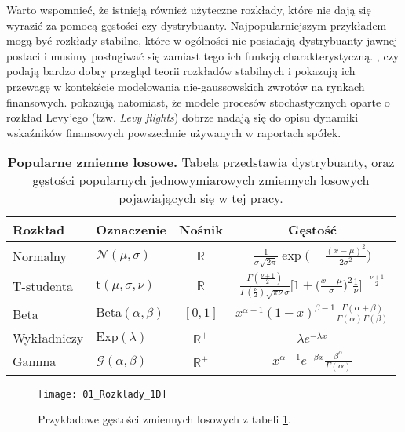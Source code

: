 Warto wspomnieć, że istnieją również użyteczne rozkłady, które nie dają się wyrazić za pomocą gęstości czy dystrybuanty. Najpopularniejszym przykładem mogą być rozkłady stabilne, które w ogólności nie posiadają dystrybuanty jawnej postaci i musimy posługiwać się zamiast tego ich funkcją charakterystyczną. \cite{Stable_Distributions1}, czy \cite{Stable_Distributions2} podają bardzo dobry przegląd teorii rozkładów stabilnych i pokazują ich przewagę w kontekście modelowania nie-gaussowskich zwrotów na rynkach finansowych. \cite{LevyFlights} pokazują natomiast, że modele procesów stochastycznych oparte o rozkład Levy'ego (tzw. \textit{Levy flights}) dobrze nadają się do opisu dynamiki wskaźników finansowych powszechnie używanych w raportach spółek.

\begin{table}[h]
	\caption{\textbf{Popularne zmienne losowe.} Tabela przedstawia dystrybuanty, oraz gęstości popularnych jednowymiarowych zmiennych losowych pojawiających się w tej pracy.}
	\label{tab:przykladowe_zmienne_losowe}
	\begin{tabular}{ll|c|c}
		\hline
		\textbf{Rozkład} & \textbf{Oznaczenie} & \textbf{Nośnik} & \textbf{Gęstość} \\
		\hline
		Normalny & $\mathcal{N}(\mu, \sigma)$ & $\mathbb{R}$ & $\frac{1}{\sigma \sqrt{2 \pi}} \exp\big(-\frac{(x-\mu)^2}{2\sigma^2}\big)$\\ 
		T-studenta & $\text{t}(\mu, \sigma, \nu)$ & $\mathbb{R}$ & $ \frac{\Gamma(\frac{\nu + 1}{2})}{\Gamma(\frac{\nu}{2})\sqrt{\pi\nu}\sigma} \bigg[1 + \big(\frac{x - \mu}{\sigma}\big)^2\frac{1}{\nu}\bigg]^{-\frac{\nu + 1}{2}} $ \\ 
		Beta & $\text{Beta}(\alpha, \beta)$ & $[0, 1]$ & $ x^{\alpha - 1}(1 - x)^{\beta - 1}\frac{\Gamma(\alpha + \beta)}{\Gamma(\alpha)\Gamma(\beta)}$ \\ 
		Wykładniczy & $\text{Exp}(\lambda)$ & $\mathbb{R}^{+}$ & $ \lambda e^{-\lambda x}$ \\
		Gamma & $\mathcal{G}(\alpha, \beta)$ & $\mathbb{R}^+$ & $x^{\alpha - 1}e^{-\beta x}\frac{\beta^\alpha}{\Gamma(\alpha)}$\\ 
		
		\hline
	\end{tabular}
\end{table}

\begin{figure}[H]
	\centering
	\texttt{[image: 01\_Rozklady\_1D]}
	\caption{Przykładowe gęstości zmiennych losowych z tabeli \ref{tab:przykladowe_zmienne_losowe}.\label{fig:przykladowe_zmienne_losowe}}
\end{figure}

